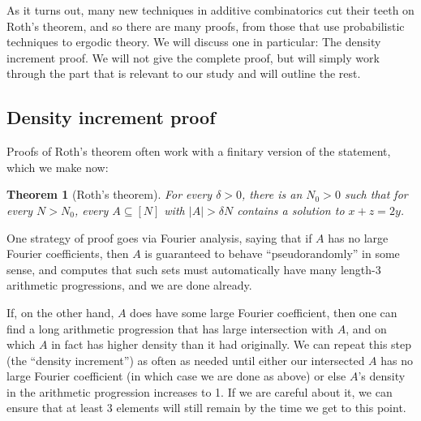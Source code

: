 \documentclass{report}
\newtheorem{theorem}{Theorem}[section]
\theoremstyle{remark}
\numberwithin{equation}{section}
\begin{document}
As it turns out, many new techniques in additive combinatorics cut
their teeth on Roth's theorem, and so there are many proofs, from
those that use probabilistic techniques to ergodic theory.  We will
discuss one in particular: The density increment proof.  We will not
give the complete proof, but will simply work through the part that is
relevant to our study and will outline the rest.

\subsection{Density increment proof}

Proofs of Roth's theorem often work with a finitary version of the
statement, which we make now:

\begin{theorem}[Roth's theorem]
  For every $\delta > 0$, there is an $N_0 > 0$ such that for every
  $N > N_0$, every $A \subseteq [N]$ with $|A| > \delta N$ contains a
  solution to $x+z=2y$.
\end{theorem}

One strategy of proof goes via Fourier analysis, saying that if $A$
has no large Fourier coefficients, then $A$ is guaranteed to behave
``pseudorandomly'' in some sense, and computes that such sets must
automatically have many length-3 arithmetic progressions, and we are
done already.  

If, on the other hand, $A$ does have some large Fourier coefficient,
then one can find a long arithmetic progression that has large
intersection with $A$, and on which $A$ in fact has higher density
than it had originally.  We can repeat this step (the ``density
increment'') as often as needed until either our intersected $A$ has
no large Fourier coefficient (in which case we are done as above) or
else $A$'s density in the arithmetic progression increases to 1.  If
we are careful about it, we can ensure that at least 3 elements will
still remain by the time we get to this point.
\end{document}

